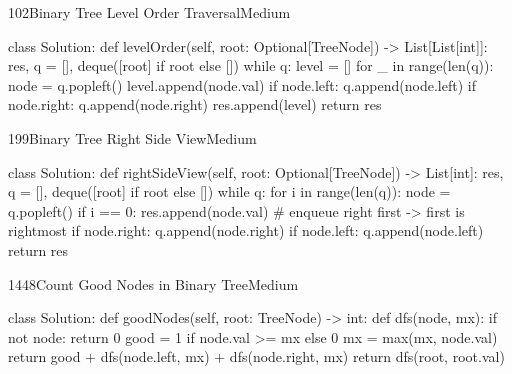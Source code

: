 \begin{problem}{102}{Binary Tree Level Order Traversal}{Medium}
\begin{code}
class Solution:
    def levelOrder(self, root: Optional[TreeNode]) -> List[List[int]]:
        res, q = [], deque([root] if root else [])
        while q:
            level = []
            for _ in range(len(q)):
                node = q.popleft()
                level.append(node.val)
                if node.left: q.append(node.left)
                if node.right: q.append(node.right)
            res.append(level)
        return res
\end{code}
\end{problem}

\begin{problem}{199}{Binary Tree Right Side View}{Medium}
\begin{code}
class Solution:
    def rightSideView(self, root: Optional[TreeNode]) -> List[int]:
        res, q = [], deque([root] if root else [])
        while q:
            for i in range(len(q)):
                node = q.popleft()
                if i == 0:
                    res.append(node.val)       # enqueue right first -> first is rightmost
                if node.right: q.append(node.right)
                if node.left: q.append(node.left)
        return res
\end{code}
\end{problem}

\begin{problem}{1448}{Count Good Nodes in Binary Tree}{Medium}
\begin{code}
class Solution:
    def goodNodes(self, root: TreeNode) -> int:
        def dfs(node, mx):
            if not node:
                return 0
            good = 1 if node.val >= mx else 0
            mx = max(mx, node.val)
            return good + dfs(node.left, mx) + dfs(node.right, mx)
        return dfs(root, root.val)
\end{code}
\end{problem}

